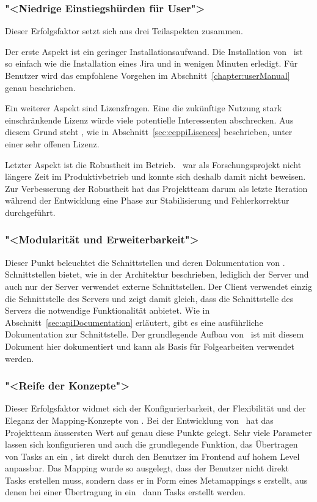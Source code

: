 		
		\subsubsection{"<Niedrige Einstiegshürden für User">}
			Dieser Erfolgsfaktor setzt sich aus drei Teilaspekten zusammen.
			
			Der erste Aspekt ist ein geringer Installationsaufwand.
			Die Installation von \eeppi\ ist so einfach wie  die Installation eines Jira und in wenigen Minuten erledigt. 
			Für Benutzer wird das empfohlene Vorgehen im Abschnitt~\ref{chapter:userManual} genau beschrieben.
			
			Ein weiterer Aspekt sind Lizenzfragen.
			Eine die zukünftige Nutzung stark einschränkende Lizenz würde viele potentielle Interessenten abschrecken.
			Aus diesem Grund steht \eeppi, wie in Abschnitt~\ref{sec:eeppiLisences} beschrieben, unter einer sehr offenen Lizenz.
			
			Letzter Aspekt ist die Robustheit im Betrieb.
			\eeppi\ war als Forschungsprojekt nicht längere Zeit im Produktivbetrieb
			und konnte sich deshalb damit nicht beweisen.
			Zur Verbesserung der Robustheit hat das Projektteam darum als letzte Iteration während der Entwicklung eine Phase zur Stabilisierung und Fehlerkorrektur durchgeführt.
		
		
		\subsubsection{"<Modularität und Erweiterbarkeit">}
			Dieser Punkt beleuchtet die Schnittstellen und deren Dokumentation von \eeppi.
			Schnittstellen bietet, wie in der Architektur beschrieben, lediglich der Server
			und auch nur der Server verwendet externe Schnittstellen.
			Der Client verwendet einzig die Schnittstelle des Servers
			und zeigt damit gleich, dass die Schnittstelle des Servers die notwendige Funktionalität anbietet.
			Wie in Abschnitt~\ref{sec:apiDocumentation} erläutert, gibt es eine ausführliche Dokumentation zur Schnittstelle.
			Der grundlegende Aufbau von \eeppi\ ist mit diesem Dokument hier dokumentiert
			und kann als Basis für Folgearbeiten verwendet werden.
			
			
		\subsubsection{"<Reife der Konzepte">}
			Dieser Erfolgsfaktor widmet sich der Konfigurierbarkeit, der Flexibilität und der Eleganz der Mapping-Konzepte von \eeppi.
			Bei der Entwicklung von \eeppi\ hat das Projektteam äussersten Wert auf genau diese Punkte gelegt.
			Sehr viele Parameter lassen sich konfigurieren und auch die grundlegende Funktion,
			das Übertragen von Tasks an ein \ppt, ist direkt durch den Benutzer im Frontend auf hohem Level anpassbar.
			Das Mapping wurde so ausgelegt, dass der Benutzer nicht direkt Tasks erstellen muss,
			sondern dass er in Form eines Metamappings \ttpl s erstellt,
			aus denen bei einer Übertragung in ein \ppt\ dann Tasks erstellt werden.
			
